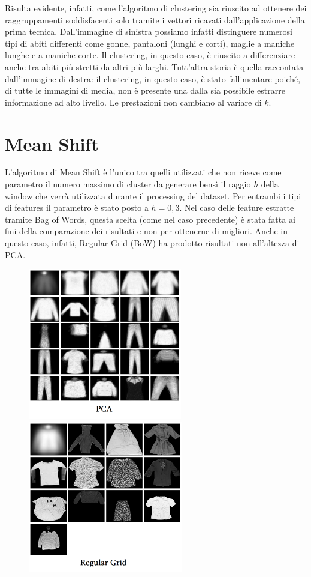 \documentclass[]{report}
\begin{document}
	Risulta evidente, infatti, come l'algoritmo di clustering sia riuscito ad ottenere dei raggruppamenti soddisfacenti solo tramite i vettori ricavati dall'applicazione della prima tecnica. Dall'immagine di sinistra possiamo infatti distinguere numerosi tipi di abiti differenti come gonne, pantaloni (lunghi e corti), maglie a maniche lunghe e a maniche corte. Il clustering, in questo caso, è riuscito a differenziare anche tra abiti più stretti da altri più larghi. 
	Tutt'altra storia è quella raccontata dall'immagine di destra: il clustering, in questo caso, è stato fallimentare poiché, di tutte le immagini di media, non è presente una dalla sia possibile estrarre informazione ad alto livello. Le prestazioni non cambiano al variare di $k$.
	
	\section*{Mean Shift}
	
	L'algoritmo di Mean Shift è l'unico tra quelli utilizzati che non riceve come parametro il numero massimo di cluster da generare bensì il raggio $h$ della window che verrà utilizzata durante il processing del dataset. Per entrambi i tipi di features il parametro è stato posto a $h = 0,3$. Nel caso delle feature estratte tramite Bag of Words,  questa scelta (come nel caso precedente) è stata fatta ai fini della comparazione dei risultati e non per ottenerne di migliori. Anche in questo caso, infatti, Regular Grid (BoW) ha prodotto risultati non all'altezza di PCA.
	
	\begin{figure}[ht!]
		\includegraphics[width=.49\textwidth,height=250px]{./img/MS_PCA}\hfill
		\includegraphics[width=.49\textwidth,height=250px]{./img/MS_RG}
	\end{figure}
	
\end{document}
